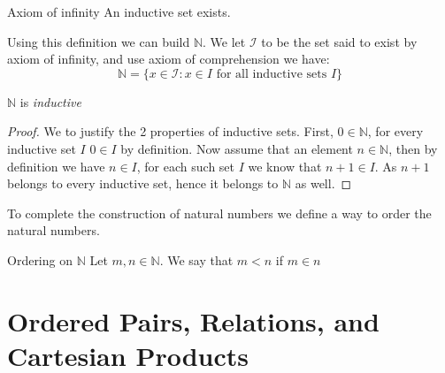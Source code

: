 \documentclass[16pt,a4paper]{article}
\theoremstyle{definition}
\begin{document}
\newpage

\begin{axm}{Axiom of infinity}{} An inductive set exists. \end{axm}


Using this definition we can build $\mathbb{N}$. We let $\mathcal{I}$ to be the set said to exist by axiom of infinity, and use axiom of comprehension we have:
\[\mathbb{N} = \{x\in \mathcal{I} : x\in I \text{ for all inductive sets } I\}\]
\begin{thm}{}{}
$\mathbb{N}$ is \textit{inductive}
\end{thm}

\begin{proof}
We to justify the 2 properties of inductive sets. First, $0\in \mathbb{N}$, for every inductive set $I$ $0\in I$ by definition. Now assume that an element $n\in \mathbb{N}$, then by definition we have $n \in I$, for each such set $I$ we know that $n+1 \in I$. As $n+1$ belongs to every inductive set, hence it belongs to $\mathbb{N}$ as well.  
\end{proof}
To complete the construction of natural numbers we define a way to order the natural numbers. 
\begin{defn}{Ordering on $\mathbb{N}$}{}
Let $m,n \in \mathbb{N}$. We say that $m < n $ if $m \in n$
\end{defn}





\section{Ordered Pairs, Relations, and Cartesian Products}
\end{document}
